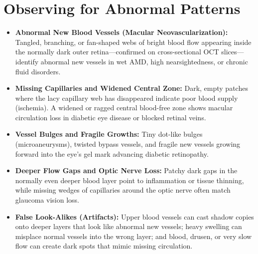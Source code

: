 \section{Observing for Abnormal Patterns}
\begin{itemize}
\item \textbf{Abnormal New Blood Vessels (Macular Neovascularization):} Tangled, branching, or fan-shaped webs of bright blood flow appearing inside the normally dark outer retina---confirmed on cross-sectional OCT slices---identify abnormal new vessels in wet AMD, high nearsightedness, or chronic fluid disorders.
\item \textbf{Missing Capillaries and Widened Central Zone:} Dark, empty patches where the lacy capillary web has disappeared indicate poor blood supply (ischemia). A widened or ragged central blood-free zone shows macular circulation loss in diabetic eye disease or blocked retinal veins.
\item \textbf{Vessel Bulges and Fragile Growths:} Tiny dot-like bulges (microaneurysms), twisted bypass vessels, and fragile new vessels growing forward into the eye's gel mark advancing diabetic retinopathy.
\item \textbf{Deeper Flow Gaps and Optic Nerve Loss:} Patchy dark gaps in the normally even deeper blood layer point to inflammation or tissue thinning, while missing wedges of capillaries around the optic nerve often match glaucoma vision loss.
\item \textbf{False Look-Alikes (Artifacts):} Upper blood vessels can cast shadow copies onto deeper layers that look like abnormal new vessels; heavy swelling can misplace normal vessels into the wrong layer; and blood, drusen, or very slow flow can create dark spots that mimic missing circulation.
\end{itemize}

